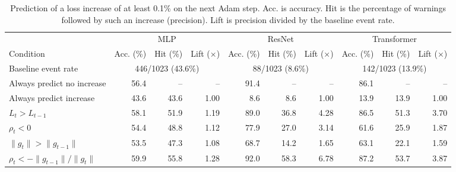 \begin{table}[!t]
\centering\small
\caption{Prediction of a loss increase of at least 0.1\% on the next Adam step. Acc. is accuracy. Hit is the percentage of warnings followed by such an increase (precision). Lift is precision divided by the baseline event rate.}
\label{tab:severity}
\setlength{\tabcolsep}{4pt}
\begin{tabular}{@{}lrrrrrrrrr@{}}
\toprule
& \multicolumn{3}{c}{MLP} & \multicolumn{3}{c}{ResNet} & \multicolumn{3}{c}{Transformer} \\
Condition & Acc. (\%) & Hit (\%) & Lift ($\times$) & Acc. (\%) & Hit (\%) & Lift ($\times$) & Acc. (\%) & Hit (\%) & Lift ($\times$) \\
\midrule
Baseline event rate & \multicolumn{3}{c}{446/1023 (43.6\%)} & \multicolumn{3}{c}{88/1023 (8.6\%)} & \multicolumn{3}{c}{142/1023 (13.9\%)} \\
\midrule
Always predict no increase & 56.4 & -- & -- & 91.4 & -- & -- & 86.1 & -- & -- \\
Always predict increase & 43.6 & 43.6 & 1.00 & 8.6 & 8.6 & 1.00 & 13.9 & 13.9 & 1.00 \\
$L_t>L_{t-1}$ & 58.1 & 51.9 & 1.19 & 89.0 & 36.8 & 4.28 & 86.5 & 51.3 & 3.70 \\
$\rho_t<0$ & 54.4 & 48.8 & 1.12 & 77.9 & 27.0 & 3.14 & 61.6 & 25.9 & 1.87 \\
$\|g_t\|>\|g_{t-1}\|$ & 53.5 & 47.3 & 1.08 & 68.7 & 14.2 & 1.65 & 63.1 & 22.1 & 1.59 \\
$\rho_t<-\|g_{t-1}\|/\|g_t\|$ & 59.9 & 55.8 & 1.28 & 92.0 & 58.3 & 6.78 & 87.2 & 53.7 & 3.87 \\
\bottomrule
\end{tabular}
\end{table}
